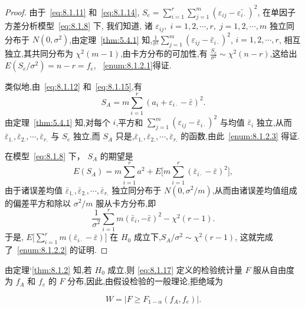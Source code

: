 \begin{proof}
由于~\eqref{eq:8.1.11} 和~\eqref{eq:8.1.14}, $S_{e}=\sum_{i=1}^{r} \sum_{j=1}^{m}(\varepsilon_{i j}-\bar{\varepsilon_{i\cdot}})^{2}$, 在单因子方差分析模型~\eqref{eq:8.1.8} 下, 我们知道, 诸 $\varepsilon_{ij}, \; i=1,2,\cdots,r,\; j=1,2,\cdots,m$ 独立同分布于 $N(0,\sigma^2)$,由定理~\ref{thm:5.4.1} 知,$\frac{1}{\sigma^2} \sum_{j=1}^m (\varepsilon_{ij} - \bar{\varepsilon}_{i\cdot})^2$, $i=1,2,\cdots,r$, 相互独立,其共同分布为 $\chi^2(m-1)$,由卡方分布的可加性,有 $\frac{S_e}{\sigma^2} \sim \chi^2(n-r)$,这给出 $E(S_e/\sigma^2) = n-r=f_e$, ~\ref{enum:8.1.2.1}得证.

类似地,由~\eqref{eq:8.1.12} 和~\eqref{eq:8.1.15},有
\begin{equation*}
  S_A =  m \sum_{i=1}^r (a_i + \varepsilon_{i\cdot} - \bar{\varepsilon})^2.
\end{equation*}
由定理~\ref{thm:5.4.1} 知,对每个 $i$,平方和 $\sum_{j=1}^m (\varepsilon_{ij} - \bar{\varepsilon}_{i\cdot})^2$ 与均值 $\bar{\varepsilon}_{i}$ 独立,从而 $\bar{\varepsilon}_{1.}, \bar{\varepsilon}_{2.},\cdots,\bar{\varepsilon}_{r.}$ 与 $S_e$ 独立,而 $S_A$ 只是,$\bar{\varepsilon}_{1.}, \bar{\varepsilon}_{2.},\cdots,\bar{\varepsilon}_{r.}$ 的函数,由此~\ref{enum:8.1.2.3} 得证.

在模型~\ref{eq:8.1.8} 下， $S_A$ 的期望是
\begin{equation*}
  E(S_A) = m \sum_{i=1}^r a^2 + E\big[m\sum_{i=1}^r (\bar{\varepsilon}_{i\cdot} - \bar{\varepsilon})^2\big],
\end{equation*}
由于诸误差均值 $\bar{\varepsilon}_{1.}, \bar{\varepsilon}_{2.},\cdots,\bar{\varepsilon}_{r.}$ 独立同分布于 $N(0, \sigma^2/m)$,从而由诸误差均值组成的偏差平方和除以 $\sigma^2/m$ 服从卡方分布,即
\begin{equation*}
  \frac{1}{\sigma^{2}} \sum_{i=1}^{r} m\left(\bar{\varepsilon}_{i},-\bar{\varepsilon}\right)^{2}-\chi^{2}(r-1).
\end{equation*}
于是, $E\big[\sum_{i=1}^r m(\bar{\varepsilon}_{i\cdot} - \bar{\varepsilon})\big]$ 在 $H_0$ 成立下,$S_A/\sigma^2 \sim \chi^2(r-1)$, 这就完成了~\ref{enum:8.1.2.2} 的证明.
\end{proof}

由定理`\ref{thm:8.1.2} 知,若 $H_0$ 成立,则 \eqref{eq:8.1.17} 定义的检验统计量 $F$ 服从自由度为 $f_A$ 和 $f_e$ 的 $F$ 分布,因此,由假设检验的一般理论,拒绝域为

\begin{equation}\label{eq:8.1.18}
W =\left\lvert F \geq F_{1-\alpha}(f_{A}, f_{e}) \right\rvert .
\end{equation}

